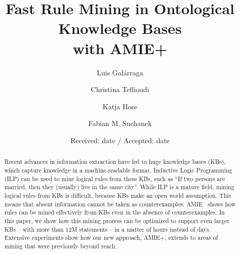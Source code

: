  
\title{Fast Rule Mining in Ontological Knowledge Bases\\ with AMIE+}


\author{Luis Gal\'arraga\and
        Christina Teflioudi \and Katja Hose \and Fabian M. Suchanek
}



\date{Received: date / Accepted: date}


\maketitle

\begin{abstract}
Recent advances in information extraction have led to huge knowledge bases (KBs), which capture knowledge in a ma\-chine-readable format.
Inductive Logic Programming (ILP) can be used to mine logical rules from these KBs, such as ``If two persons are married, then they (usually) live in the same city''.
While ILP is a mature field, mining logical rules from KBs is difficult, because KBs make an open world assumption.
This means that absent information cannot be taken as counterexamples.
AMIE~\cite{amie} shows how rules can be mined effectively from KBs even in the absence of counterexamples.
In this paper, we show how this mining process can be optimized to support even larger KBs -- with more than 12M statements -- in a matter of hours instead of days.
Extensive experiments show how our new approach, AMIE+, extends to areas of mining that were previously beyond reach.
\end{abstract}



